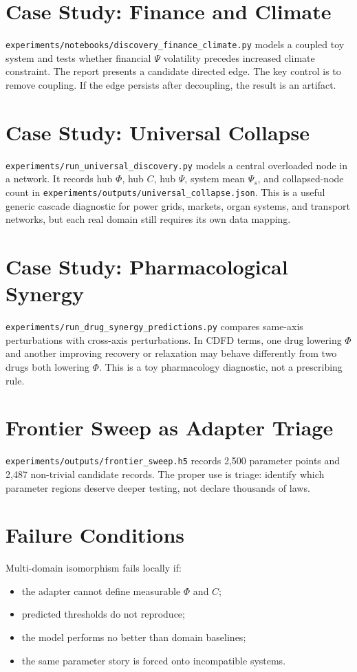 \documentclass[12pt,a4paper]{article}
\begin{document}
\section{Case Study: Finance and Climate}
\texttt{experiments/notebooks/discovery\_finance\_climate.py} models a coupled
toy system and tests whether financial $\Psi$ volatility precedes increased
climate constraint. The report presents a candidate directed edge. The key
control is to remove coupling. If the edge persists after decoupling, the
result is an artifact.

\section{Case Study: Universal Collapse}
\texttt{experiments/run\_universal\_discovery.py} models a central overloaded
node in a network. It records hub $\Phi$, hub $C$, hub $\Psi$, system mean
$\Psi_s$, and collapsed-node count in
\texttt{experiments/outputs/universal\_collapse.json}. This is a useful generic
cascade diagnostic for power grids, markets, organ systems, and transport
networks, but each real domain still requires its own data mapping.

\section{Case Study: Pharmacological Synergy}
\texttt{experiments/run\_drug\_synergy\_predictions.py} compares same-axis
perturbations with cross-axis perturbations. In CDFD terms, one drug lowering
$\Phi$ and another improving recovery or relaxation may behave differently from
two drugs both lowering $\Phi$. This is a toy pharmacology diagnostic, not a
prescribing rule.

\section{Frontier Sweep as Adapter Triage}
\texttt{experiments/outputs/frontier\_sweep.h5} records 2,500 parameter points
and 2,487 non-trivial candidate records. The proper use is triage: identify
which parameter regions deserve deeper testing, not declare thousands of laws.

\section{Failure Conditions}
Multi-domain isomorphism fails locally if:
\begin{itemize}
    \item the adapter cannot define measurable $\Phi$ and $C$;
    \item predicted thresholds do not reproduce;
    \item the model performs no better than domain baselines;
    \item the same parameter story is forced onto incompatible systems.
\end{itemize}
\end{document}
